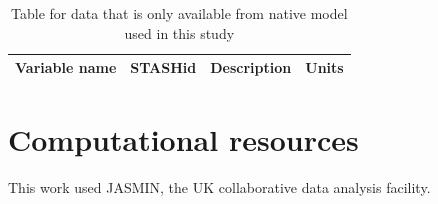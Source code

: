 \begin{table}
    \centering
    \begin{tabular}{l l l l}
        \hline
        Variable name &  STASHid & Description & Units \\
        \hline
        
    \end{tabular}
    \caption{Table for data that is only available from native model used in this study}
    \label{tab:stash-ids}
\end{table}

\section{Computational resources}

This work used JASMIN, the UK collaborative data analysis facility.